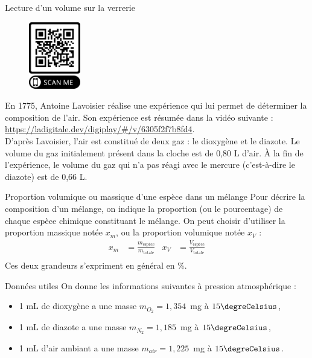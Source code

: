 \begin{doc}{Lecture d'un volume sur la verrerie}
\begin{figure}
\vspace{-1cm}
    \centering
      \includegraphics[width=0.2\textwidth]{Images/DM/Qr_code_Lavoisier.png}
  \end{figure}
En 1775, Antoine Lavoisier réalise une expérience qui lui permet de déterminer la composition de l’air.
Son expérience est résumée dans la vidéo suivante : \url{https://ladigitale.dev/digiplay/#/v/6305f2f7b8fd4}.\\
D’après Lavoisier, l’air est constitué de deux gaz : le dioxygène et le diazote. Le volume du gaz initialement
présent dans la cloche est de 0,80 L d’air. À la fin de l’expérience, le volume du gaz qui n’a pas réagi avec le mercure (c’est-à-dire le diazote) est de 0,66 L.
\end{doc}

\begin{doc}{Proportion volumique ou massique d’une espèce dans un mélange}
Pour décrire la composition d’un mélange, on indique la proportion (ou le pourcentage) de chaque espèce chimique constituant le mélange. On peut choisir d’utiliser la proportion massique notée $x_m$, ou la proportion volumique notée $x_V$ :
\begin{align*}
    x_m &= \frac{m_{\text{espèce}}}{m_{\text{totale}}} & x_V & = \frac{V_{\text{espèce}}}{V_{\text{totale}}}\\
\end{align*}
Ces deux grandeurs s'expriment en général en \%.
\end{doc}

\begin{doc}{Données utiles}
On donne les informations suivantes à pression atmosphérique :
\begin{itemize}
    \item 1 mL de dioxygène a une masse $m_{O_2}
=1,354$~mg à $15\degreCelsius$,
    \item 1 mL de diazote a une masse $m_{N_2}
=1,185$~mg à $15\degreCelsius$,
    \item 1 mL d’air ambiant a une masse $m_{air}=1,225$~mg à $15\degreCelsius$.
\end{itemize}
\end{doc}

